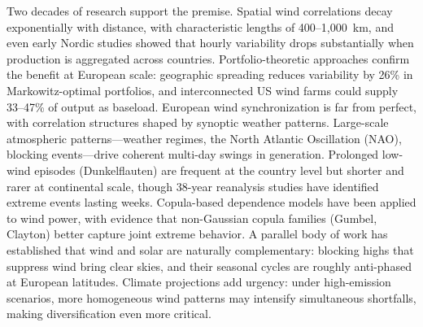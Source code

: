 \documentclass[sn-nature]{sn-jnl}%
\begin{document}
Two decades of research support the premise. Spatial wind correlations decay exponentially with distance, with characteristic lengths of 400--1,000~km\cite{malvaldi2017,olauson2016,tong2021}, and even early Nordic studies showed that hourly variability drops substantially when production is aggregated across countries\cite{holttinen2005wind}. Portfolio-theoretic approaches confirm the benefit at European scale: geographic spreading reduces variability by 26\% in Markowitz-optimal portfolios\cite{lopezprol2024,roques2010,drake2007,markowitz1952}, and interconnected US wind farms could supply 33--47\% of output as baseload\cite{archer2007}. European wind synchronization is far from perfect, with correlation structures shaped by synoptic weather patterns\cite{monforti2016}. Large-scale atmospheric patterns---weather regimes, the North Atlantic Oscillation (NAO), blocking events---drive coherent multi-day swings in generation\cite{grams2017,brayshaw2011,bloomfield2020,vanderwiel2019weather}. Prolonged low-wind episodes (Dunkelflauten) are frequent at the country level but shorter and rarer at continental scale\cite{raynaud2018,kaspar2019,vanderwiel2019meteo}, though 38-year reanalysis studies have identified extreme events lasting weeks\cite{kittel2026}. Copula-based dependence models have been applied to wind power\cite{papaefthymiou2009,hagspiel2012}, with evidence that non-Gaussian copula families (Gumbel, Clayton) better capture joint extreme behavior\cite{louie2014}. A parallel body of work has established that wind and solar are naturally complementary: blocking highs that suppress wind bring clear skies, and their seasonal cycles are roughly anti-phased at European latitudes\cite{heide2010,huber2014,pfenninger2016}. Climate projections add urgency: under high-emission scenarios, more homogeneous wind patterns may intensify simultaneous shortfalls\cite{wohland_more_2017,qu2025}, making diversification even more critical.
\end{document}
